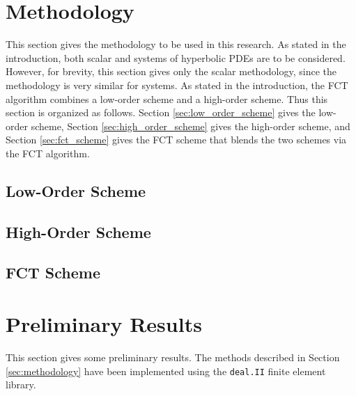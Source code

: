 \documentclass[12pt]{article}
\begin{document}
\section{Methodology\label{sec:methodology}}
This section gives the methodology to be used in this research. As stated in
the introduction, both scalar and systems of hyperbolic PDEs are to be
considered. However, for brevity, this section gives only the scalar
methodology, since the methodology is very similar for systems. As stated in the
introduction, the FCT algorithm combines a low-order scheme and a high-order
scheme.  Thus this section is organized as follows.  Section
\ref{sec:low_order_scheme} gives the low-order scheme, Section
\ref{sec:high_order_scheme} gives the high-order scheme, and Section
\ref{sec:fct_scheme} gives the FCT scheme that blends the two schemes via the
FCT algorithm.
\subsection{Low-Order Scheme\label{sec:low_order_scheme}}


\subsection{High-Order Scheme\label{sec:high_order_scheme}}


\subsection{FCT Scheme\label{sec:fct_scheme}}


\section{Preliminary Results\label{sec:results}}
This section gives some preliminary results. The methods described
in Section \ref{sec:methodology} have been implemented using the
\texttt{deal.II} finite element library\cite{dealii}.
\end{document}
